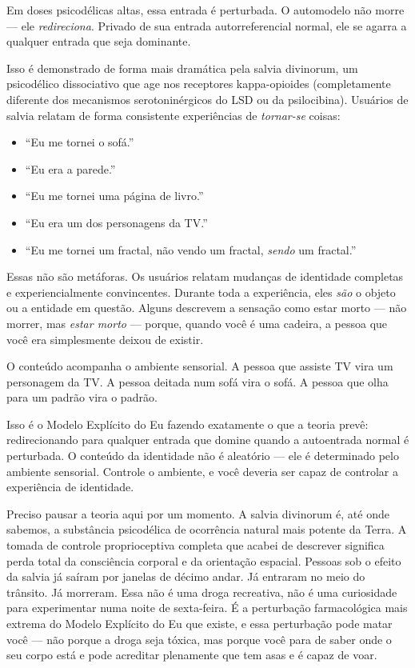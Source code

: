 \documentclass[11pt, twoside, openright]{book}
\begin{document}
Em doses psicodélicas altas, essa entrada é perturbada. O automodelo não morre --- ele \textit{redireciona}. Privado de sua entrada autorreferencial normal, ele se agarra a qualquer entrada que seja dominante.

Isso é demonstrado de forma mais dramática pela salvia divinorum, um psicodélico dissociativo que age nos receptores kappa-opioides (completamente diferente dos mecanismos serotoninérgicos do LSD ou da psilocibina). Usuários de salvia relatam de forma consistente experiências de \textit{tornar-se} coisas:

\begin{itemize}
  \item ``Eu me tornei o sofá.''
  \item ``Eu era a parede.''
  \item ``Eu me tornei uma página de livro.''
  \item ``Eu era um dos personagens da TV.''
  \item ``Eu me tornei um fractal, não vendo um fractal, \textit{sendo} um fractal.''
\end{itemize}

Essas não são metáforas. Os usuários relatam mudanças de identidade completas e experiencialmente convincentes. Durante toda a experiência, eles \textit{são} o objeto ou a entidade em questão. Alguns descrevem a sensação como estar morto --- não morrer, mas \textit{estar morto} --- porque, quando você é uma cadeira, a pessoa que você era simplesmente deixou de existir.

O conteúdo acompanha o ambiente sensorial. A pessoa que assiste TV vira um personagem da TV. A pessoa deitada num sofá vira o sofá. A pessoa que olha para um padrão vira o padrão.

Isso é o Modelo Explícito do Eu fazendo exatamente o que a teoria prevê: redirecionando para qualquer entrada que domine quando a autoentrada normal é perturbada. O conteúdo da identidade não é aleatório --- ele é determinado pelo ambiente sensorial. Controle o ambiente, e você deveria ser capaz de controlar a experiência de identidade.

Preciso pausar a teoria aqui por um momento. A salvia divinorum é, até onde sabemos, a substância psicodélica de ocorrência natural mais potente da Terra. A tomada de controle proprioceptiva completa que acabei de descrever significa perda total da consciência corporal e da orientação espacial. Pessoas sob o efeito da salvia já saíram por janelas de décimo andar. Já entraram no meio do trânsito. Já morreram. Essa não é uma droga recreativa, não é uma curiosidade para experimentar numa noite de sexta-feira. É a perturbação farmacológica mais extrema do Modelo Explícito do Eu que existe, e essa perturbação pode matar você --- não porque a droga seja tóxica, mas porque você para de saber onde o seu corpo está e pode acreditar plenamente que tem asas e é capaz de voar.
\end{document}
